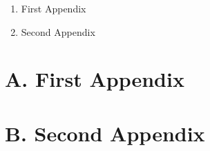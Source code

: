 

{\Large
	\begin{enumerate}[label=\Alph*.]
		\item First Appendix
		\item Second Appendix
	\end{enumerate}
}

\clearpage
\section*{A. First Appendix}


\clearpage
\section*{B. Second Appendix}
